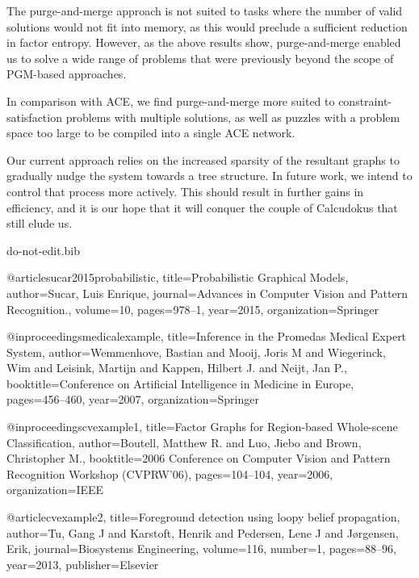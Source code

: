 \documentclass{ieeeaccess}
\begin{document}
{	The purge-and-merge approach is not suited to tasks where the number of valid solutions would not fit into memory, as this would preclude a sufficient reduction in factor entropy. However, as the above results show, purge-and-merge enabled us to solve a wide range of problems that were previously beyond the scope of PGM-based approaches. 
	
	In comparison with ACE, we find purge-and-merge more suited to constraint-satisfaction problems with multiple solutions, as well as puzzles with a problem space too large to be compiled into a single ACE network. 
	
	Our current approach relies on the increased sparsity of the resultant graphs to gradually nudge the system towards a tree structure. In future work, we intend to control that process more actively. This should result in further gains in efficiency, and it is our hope that it will conquer the couple of Calcudokus that still elude us.
	
	
	\begin{filecontents*}[overwrite]{do-not-edit.bib}
		
		@article{sucar2015probabilistic,
			title={{P}robabilistic {G}raphical {M}odels},
			author={Sucar, Luis Enrique},
			journal={Advances in Computer Vision and Pattern Recognition.},
			volume={10},
			pages={978--1},
			year={2015},
			organization={Springer}
		}
		
		@inproceedings{medicalexample,
			title={{I}nference in the {P}romedas {M}edical {E}xpert {S}ystem},
			author={Wemmenhove, Bastian and Mooij, Joris M and Wiegerinck, Wim and Leisink, Martijn and Kappen, Hilbert J. and Neijt, Jan P.},
			booktitle={{C}onference on {A}rtificial {I}ntelligence in {M}edicine in {E}urope},
			pages={456--460},
			year={2007},
			organization={Springer}
		}
		
		@inproceedings{cvexample1,
			title={{F}actor {G}raphs for {R}egion-based {W}hole-scene {C}lassification},
			author={Boutell, Matthew R. and Luo, Jiebo and Brown, Christopher M.},
			booktitle={2006 {C}onference on {C}omputer {V}ision and {P}attern {R}ecognition {W}orkshop ({CVPRW}'06)},
			pages={104--104},
			year={2006},
			organization={IEEE}
		}
		
		@article{cvexample2,
			title={Foreground detection using loopy belief propagation},
			author={Tu, Gang J and Karstoft, Henrik and Pedersen, Lene J and J{\o}rgensen, Erik},
			journal={Biosystems Engineering},
			volume={116},
			number={1},
			pages={88--96},
			year={2013},
			publisher={Elsevier}
		}
		

\end{filecontents*}}
\end{document}
